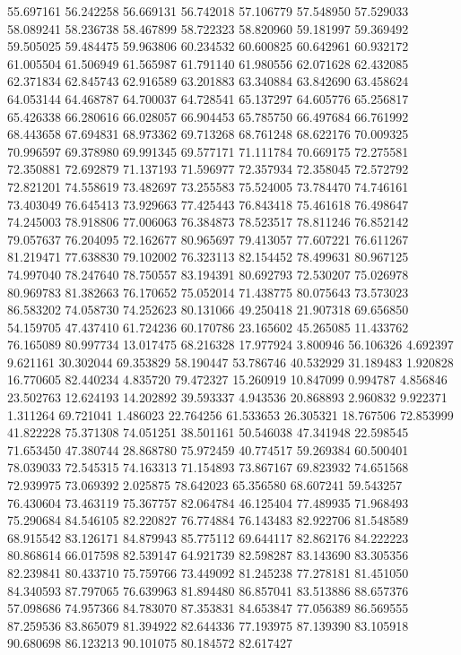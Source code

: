 55.697161
56.242258
56.669131
56.742018
57.106779
57.548950
57.529033
58.089241
58.236738
58.467899
58.722323
58.820960
59.181997
59.369492
59.505025
59.484475
59.963806
60.234532
60.600825
60.642961
60.932172
61.005504
61.506949
61.565987
61.791140
61.980556
62.071628
62.432085
62.371834
62.845743
62.916589
63.201883
63.340884
63.842690
63.458624
64.053144
64.468787
64.700037
64.728541
65.137297
64.605776
65.256817
65.426338
66.280616
66.028057
66.904453
65.785750
66.497684
66.761992
68.443658
67.694831
68.973362
69.713268
68.761248
68.622176
70.009325
70.996597
69.378980
69.991345
69.577171
71.111784
70.669175
72.275581
72.350881
72.692879
71.137193
71.596977
72.357934
72.358045
72.572792
72.821201
74.558619
73.482697
73.255583
75.524005
73.784470
74.746161
73.403049
76.645413
73.929663
77.425443
76.843418
75.461618
76.498647
74.245003
78.918806
77.006063
76.384873
78.523517
78.811246
76.852142
79.057637
76.204095
72.162677
80.965697
79.413057
77.607221
76.611267
81.219471
77.638830
79.102002
76.323113
82.154452
78.499631
80.967125
74.997040
78.247640
78.750557
83.194391
80.692793
72.530207
75.026978
80.969783
81.382663
76.170652
75.052014
71.438775
80.075643
73.573023
86.583202
74.058730
74.252623
80.131066
49.250418
21.907318
69.656850
54.159705
47.437410
61.724236
60.170786
23.165602
45.265085
11.433762
76.165089
80.997734
13.017475
68.216328
17.977924
3.800946
56.106326
4.692397
9.621161
30.302044
69.353829
58.190447
53.786746
40.532929
31.189483
1.920828
16.770605
82.440234
4.835720
79.472327
15.260919
10.847099
0.994787
4.856846
23.502763
12.624193
14.202892
39.593337
4.943536
20.868893
2.960832
9.922371
1.311264
69.721041
1.486023
22.764256
61.533653
26.305321
18.767506
72.853999
41.822228
75.371308
74.051251
38.501161
50.546038
47.341948
22.598545
71.653450
47.380744
28.868780
75.972459
40.774517
59.269384
60.500401
78.039033
72.545315
74.163313
71.154893
73.867167
69.823932
74.651568
72.939975
73.069392
2.025875
78.642023
65.356580
68.607241
59.543257
76.430604
73.463119
75.367757
82.064784
46.125404
77.489935
71.968493
75.290684
84.546105
82.220827
76.774884
76.143483
82.922706
81.548589
68.915542
83.126171
84.879943
85.775112
69.644117
82.862176
84.222223
80.868614
66.017598
82.539147
64.921739
82.598287
83.143690
83.305356
82.239841
80.433710
75.759766
73.449092
81.245238
77.278181
81.451050
84.340593
87.797065
76.639963
81.894480
86.857041
83.513886
88.657376
57.098686
74.957366
84.783070
87.353831
84.653847
77.056389
86.569555
87.259536
83.865079
81.394922
82.644336
77.193975
87.139390
83.105918
90.680698
86.123213
90.101075
80.184572
82.617427
